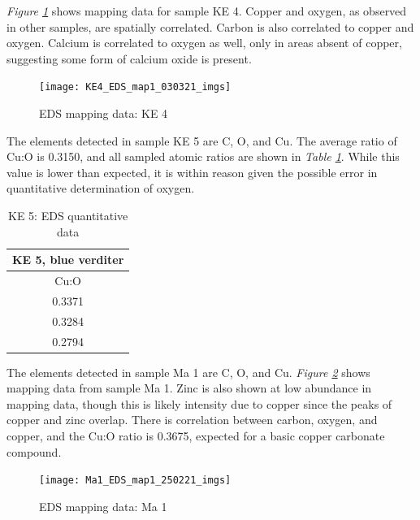 \textit{Figure \ref{fig:ke4_map1}} shows mapping data for sample KE 4. Copper and oxygen, as observed in other samples, are spatially correlated. Carbon is also correlated to copper and oxygen. Calcium is correlated to oxygen as well, only in areas absent of copper, suggesting some form of calcium oxide is present.

\begin{figure}[H]
\centering
  \texttt{[image: KE4\_EDS\_map1\_030321\_imgs]}
\caption[EDS mapping data: KE 4]{EDS mapping data: KE 4}
\label{fig:ke4_map1}
\end{figure}


The elements detected in sample KE 5 are C, O, and Cu. The average ratio of Cu:O is 0.3150, and all sampled atomic ratios are shown in \textit{Table \ref{table:ke5_ratios}}. While this value is lower than expected, it is within reason given the possible error in quantitative determination of oxygen.

\begin{table}[H]
\caption{KE 5: EDS quantitative data}
\centering
\label{table:ke5_ratios}
\begin{tabular}{c}
\toprule
KE 5, blue verditer \\
\midrule
Cu:O \\
\midrule
0.3371 \\
0.3284 \\
0.2794 \\
\bottomrule
\end{tabular}
\end{table}


The elements detected in sample Ma 1 are C, O, and Cu. \textit{Figure \ref{fig:ma1_map1}} shows mapping data from sample Ma 1. Zinc is also shown at low abundance in mapping data, though this is likely intensity due to copper since the peaks of copper and zinc overlap. There is correlation between carbon, oxygen, and copper, and the Cu:O ratio is 0.3675, expected for a basic copper carbonate compound. 

\begin{figure}[H]
\centering
  \texttt{[image: Ma1\_EDS\_map1\_250221\_imgs]}
\caption[EDS mapping data: Ma 1]{EDS mapping data: Ma 1}
\label{fig:ma1_map1}
\end{figure}

